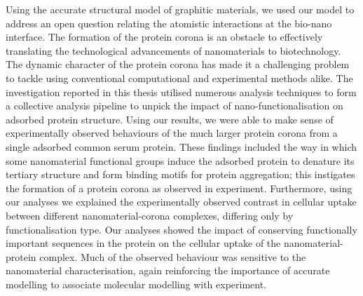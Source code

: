 Using the accurate structural model of graphitic materials, we used our model to address an open question relating the atomistic interactions at the bio-nano interface. The formation of the protein corona is an obstacle to effectively translating the technological advancements of nanomaterials to biotechnology. The dynamic character of the protein corona has made it a challenging problem to tackle using conventional computational and experimental methods alike. The investigation reported in this thesis utilised numerous analysis techniques to form a collective analysis pipeline to unpick the impact of nano-functionalisation on adsorbed protein structure. Using our results, we were able to make sense of experimentally observed behaviours of the much larger protein corona from a single adsorbed common serum protein. These findings included the way in which some nanomaterial functional groups induce the adsorbed protein to denature its tertiary structure and form binding motifs for protein aggregation; this instigates the formation of a protein corona as observed in experiment. Furthermore, using our analyses we explained the experimentally observed contrast in cellular uptake between different nanomaterial-corona complexes, differing only by functionalisation type. Our analyses showed the impact of conserving functionally important sequences in the protein on the cellular uptake of the nanomaterial-protein complex. Much of the observed behaviour was sensitive to the nanomaterial characterisation, again reinforcing the importance of accurate modelling to associate molecular modelling with experiment.\\

